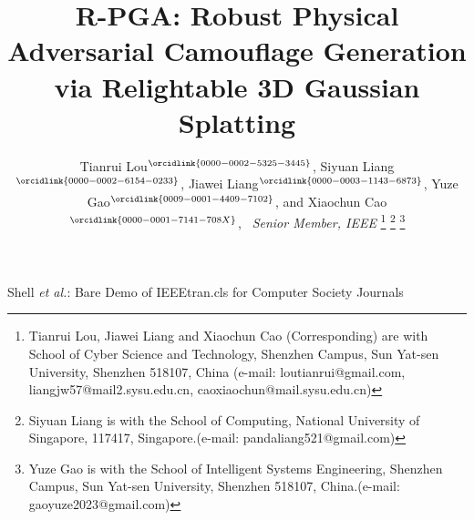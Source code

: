 \documentclass[10pt,journal,compsoc]{IEEEtran}
\begin{document}
%


\title{R-PGA: Robust Physical Adversarial Camouflage Generation via Relightable 3D Gaussian Splatting}

\author{
    Tianrui Lou$^{\orcidlink{0000-0002-5325-3445}}$, Siyuan Liang$^{\orcidlink{0000-0002-6154-0233}}$, Jiawei Liang$^{\orcidlink{0000-0003-1143-6873}}$,  Yuze Gao$^{\orcidlink{0009-0001-4409-7102}}$,  and Xiaochun Cao$^{\orcidlink{0000-0001-7141-708X}}$, ~\textit{Senior Member, IEEE}
\thanks{
Tianrui Lou, Jiawei Liang and Xiaochun Cao (Corresponding) are with School of Cyber Science and Technology, Shenzhen Campus, Sun Yat-sen University, Shenzhen 518107, China (e-mail: loutianrui@gmail.com, liangjw57@mail2.sysu.edu.cn, caoxiaochun@mail.sysu.edu.cn)}
\thanks{Siyuan Liang is with the School of Computing, National University of Singapore, 117417, Singapore.(e-mail: pandaliang521@gmail.com)}
\thanks{Yuze Gao is with the School of Intelligent Systems Engineering, Shenzhen Campus, Sun Yat-sen University, Shenzhen 518107, China.(e-mail: gaoyuze2023@gmail.com)}
}

%
{Shell \MakeLowercase{\textit{et al.}}: Bare Demo of IEEEtran.cls for Computer Society Journals}
\end{document}
